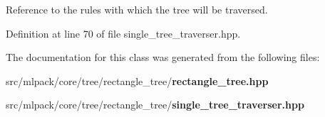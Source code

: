 Reference to the rules with which the tree will be traversed. 



Definition at line 70 of file single\+\_\+tree\+\_\+traverser.\+hpp.



The documentation for this class was generated from the following files\+:\begin{DoxyCompactItemize}
\item 
src/mlpack/core/tree/rectangle\+\_\+tree/{\bf rectangle\+\_\+tree.\+hpp}\item 
src/mlpack/core/tree/rectangle\+\_\+tree/{\bf single\+\_\+tree\+\_\+traverser.\+hpp}\end{DoxyCompactItemize}
